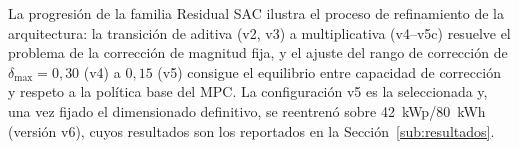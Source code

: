 \documentclass[12pt, a4paper, twoside]{report}
\begin{document}
La progresión de la familia Residual SAC ilustra el proceso de refinamiento de
la arquitectura: la transición de aditiva (v2, v3) a multiplicativa (v4--v5c)
resuelve el problema de la corrección de magnitud fija, y el ajuste del rango
de corrección de $\delta_{\max} = 0{,}30$ (v4) a $0{,}15$ (v5) consigue el
equilibrio entre capacidad de corrección y respeto a la política base del MPC.
La configuración v5 es la seleccionada y, una vez fijado el dimensionado
definitivo, se reentrenó sobre \SI{42}{kWp}/\SI{80}{kWh} (versión v6), cuyos
resultados son los reportados en la Sección~\ref{sub:resultados}.
\end{document}
